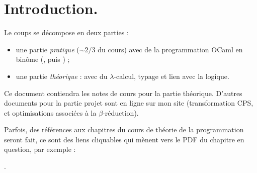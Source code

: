 \documentclass[./main]{subfiles}
\begin{document}
  \chapter*{Introduction.}

  Le coups se décompose en deux parties :
  \begin{itemize}
    \item une partie \textit{pratique} ($\sim 2/3$ du cours) avec de la programmation OCaml en binôme (\fouine, puis \pieuvre) ;
    \item une partie \textit{théorique} : avec du $\lambda$-calcul, typage et lien avec la logique.
  \end{itemize}

  Ce document contiendra les notes de cours pour la partie théorique.
  D'autres documents pour la partie projet sont en ligne sur mon site (transformation CPS, et optimisations associées à la $\beta$-réduction).

  Parfois, des références aux chapitres du cours de théorie de la programmation seront fait, ce sont des liens cliquables qui mènent vers le PDF du chapitre en question, par exemple :
  \begin{center}
    .
  \end{center}
\end{document}
